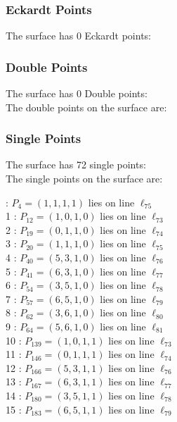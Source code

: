 \documentclass{article}
\begin{document}
{\subsubsection*{Eckardt Points}
The surface has 0 Eckardt points:\\
\subsubsection*{Double Points}
The surface has 0 Double points:\\
The double points on the surface are:\\
\begin{multicols}{2}
\noindent
\end{multicols}
\subsubsection*{Single Points}
The surface has 72 single points:\\
The single points on the surface are:\\
\begin{multicols}{2}
 : $P_{4}=( 1, 1, 1, 1 )$ lies on line $\ell_{75}$\\
1 : $P_{12}=( 1, 0, 1, 0 )$ lies on line $\ell_{73}$\\
2 : $P_{19}=( 0, 1, 1, 0 )$ lies on line $\ell_{74}$\\
3 : $P_{20}=( 1, 1, 1, 0 )$ lies on line $\ell_{75}$\\
4 : $P_{40}=( 5, 3, 1, 0 )$ lies on line $\ell_{76}$\\
5 : $P_{41}=( 6, 3, 1, 0 )$ lies on line $\ell_{77}$\\
6 : $P_{54}=( 3, 5, 1, 0 )$ lies on line $\ell_{78}$\\
7 : $P_{57}=( 6, 5, 1, 0 )$ lies on line $\ell_{79}$\\
8 : $P_{62}=( 3, 6, 1, 0 )$ lies on line $\ell_{80}$\\
9 : $P_{64}=( 5, 6, 1, 0 )$ lies on line $\ell_{81}$\\
10 : $P_{139}=( 1, 0, 1, 1 )$ lies on line $\ell_{73}$\\
11 : $P_{146}=( 0, 1, 1, 1 )$ lies on line $\ell_{74}$\\
12 : $P_{166}=( 5, 3, 1, 1 )$ lies on line $\ell_{76}$\\
13 : $P_{167}=( 6, 3, 1, 1 )$ lies on line $\ell_{77}$\\
14 : $P_{180}=( 3, 5, 1, 1 )$ lies on line $\ell_{78}$\\
15 : $P_{183}=( 6, 5, 1, 1 )$ lies on line $\ell_{79}$\\

\end{multicols}}
\end{document}
